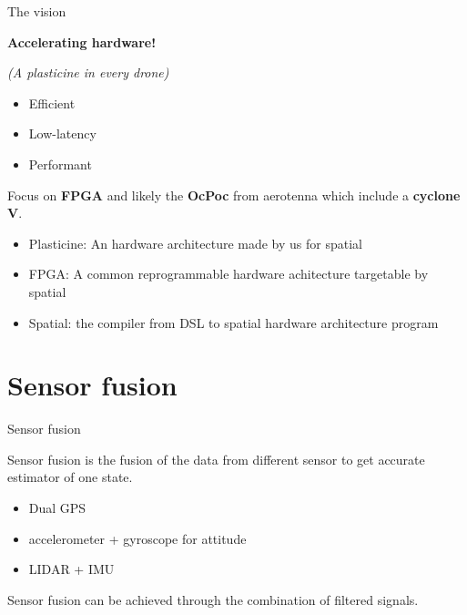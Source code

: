 \begin{frame}{The vision}

\textbf{Accelerating hardware! }

\emph{(A plasticine in every drone)}

\begin{itemize}
\tightlist
\item
  Efficient
\item
  Low-latency
\item
  Performant
\end{itemize}

Focus on \textbf{FPGA} and likely the \textbf{OcPoc} from aerotenna
which include a \textbf{cyclone V}.

\end{frame}

\begin{frame}{}

\begin{itemize}
\tightlist
\item
  Plasticine: An hardware architecture made by us for spatial
\item
  FPGA: A common reprogrammable hardware achitecture targetable by
  spatial
\item
  Spatial: the compiler from DSL to spatial hardware architecture
  program
\end{itemize}

\end{frame}

\section{Sensor fusion}\label{sensor-fusion}

\begin{frame}{Sensor fusion}

Sensor fusion is the fusion of the data from different sensor to get
accurate estimator of one state.

\begin{itemize}
\tightlist
\item
  Dual GPS
\item
  accelerometer + gyroscope for attitude
\item
  LIDAR + IMU
\end{itemize}

Sensor fusion can be achieved through the combination of filtered
signals.

\end{frame}

